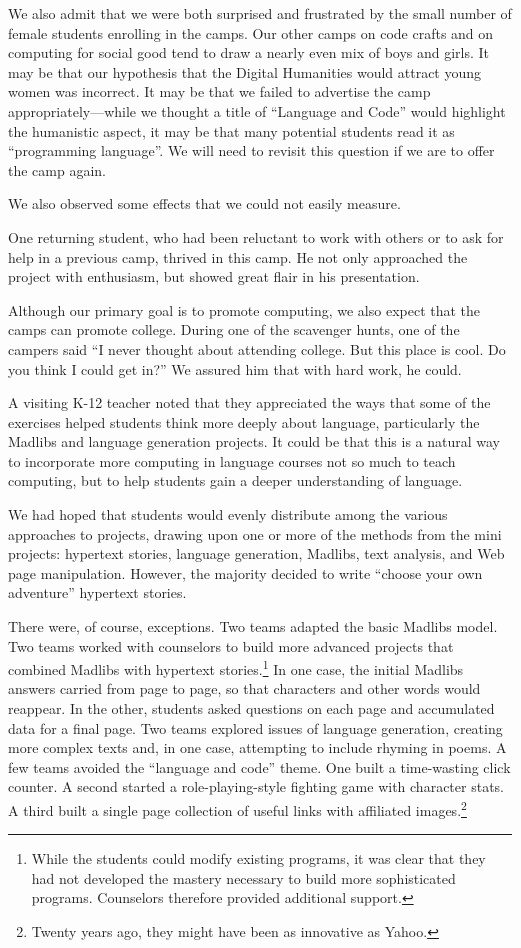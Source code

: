 We also admit that we were both surprised and frustrated by the
small number of female students enrolling in the camps.  Our other
camps on code crafts and on computing for social good tend to draw
a nearly even mix of boys and girls.  It may be that our hypothesis
that the Digital Humanities would attract young women was incorrect.
It may be that we failed to advertise the camp appropriately---while
we thought a title of ``Language and Code'' would highlight the
humanistic aspect, it may be that many potential students read it
as ``programming language''.  We will need to revisit this question
if we are to offer the camp again.

We also observed some effects that we could not easily measure.

One returning student, who had been reluctant to work with others
or to ask for help in a previous camp, thrived in this camp.  He not
only approached the project with enthusiasm, but showed great
flair in his presentation.

Although our primary goal is to promote computing, we also expect
that the camps can promote college.  During one of the scavenger
hunts, one of the campers said ``I never thought about attending
college.  But this place is cool.  Do you think I could get in?''
We assured him that with hard work, he could.

A visiting K-12 teacher noted that they appreciated the ways that
some of the exercises helped students think more deeply about
language, particularly the Madlibs and language generation projects.
It could be that this is a natural way to incorporate more computing
in language courses not so much to teach computing, but to help
students gain a deeper understanding of language.

We had hoped that students would evenly distribute among the various
approaches to projects, drawing upon one or more of the methods
from the mini projects: hypertext stories, language generation, Madlibs, 
text analysis, and Web page manipulation.  However, the
majority decided to write ``choose your own adventure'' hypertext stories.

There were, of course, exceptions.  Two teams adapted the basic Madlibs 
model.  Two teams worked with counselors to build more advanced
projects that combined Madlibs with hypertext stories.\footnote{While
the students could modify existing programs, it was clear that they
had not developed the mastery necessary to build more sophisticated
programs.  Counselors therefore provided additional support.}
In one case, the initial Madlibs answers carried from page to page,
so that characters and other words would reappear.  In the other,
students asked questions on each page and accumulated data for a
final page.  Two teams explored issues of language generation,
creating more complex texts and, in one case, attempting to include
rhyming in poems.  
A few teams avoided the ``language and code'' theme.
One built a time-wasting click counter.  A second started
a role-playing-style fighting game with character stats.  A
third built a single page collection of useful links with affiliated
images.\footnote{Twenty years ago, they might have been as
innovative as Yahoo.}

